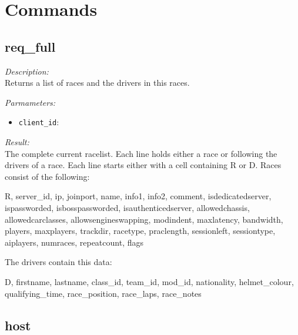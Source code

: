 \section{Commands}

\subsection{req\_full}

\begin{description}
\item {\it Description:}\\
Returns a list of races and the drivers in this races.
\item {\it Parmameters:}
\begin{itemize}
\item {\tt client\_id}: 
\end{itemize}
\item {\it Result:}\\
The complete current racelist. Each line holds either a race or following the drivers of a race. Each line starts either with a cell containing R or D. Races consist of the following: 
				
			R, 
			server\_id, 
			ip, 
			joinport, 
			name, 
			info1, 
			info2, 
			comment, 
			isdedicatedserver, 
			ispassworded, 
			isbosspassworded, 
			isauthenticedserver, 
			allowedchassis, 
			allowedcarclasses, 
			allowsengineswapping, 
			modindent, 
			maxlatency, 
			bandwidth, 
			players,
			maxplayers, 
			trackdir, 
			racetype, 
			praclength, 
			sessionleft, 
			sessiontype,
			aiplayers,
			numraces,
			repeatcount,
			flags


			The drivers contain this data:

			D,
			firstname,
			lastname,
			class\_id,
			team\_id,
			mod\_id,
			nationality,
			helmet\_colour,
			qualifying\_time,
			race\_position,
			race\_laps,
			race\_notes
			
\end{description}

\subsection{host}

